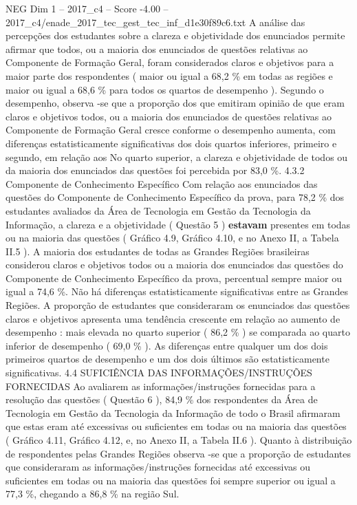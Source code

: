 \begin{textsample}{NEG Dim 1 – 2017\_c4 – Score -4.00 – 2017\_c4/enade\_2017\_tec\_gest\_tec\_inf\_d1e30f89c6.txt}
A análise das percepções dos estudantes sobre a clareza e objetividade dos enunciados permite afirmar que todos, ou a maioria dos enunciados de questões relativas ao Componente de Formação Geral, foram considerados claros e objetivos para a maior parte dos respondentes ( maior ou igual a 68,2 \% em todas as regiões e maior ou igual a 68,6 \% para todos os quartos de desempenho ).
Segundo o desempenho, observa -se que a proporção dos que emitiram opinião de que eram claros e objetivos todos, ou a maioria dos enunciados de questões relativas ao Componente de Formação Geral cresce conforme o desempenho aumenta, com diferenças estatisticamente significativas dos dois quartos inferiores, primeiro e segundo, em relação aos No quarto superior, a clareza e objetividade de todos ou da maioria dos enunciados das questões foi percebida por 83,0 \%. 4.3.2 Componente de Conhecimento Específico Com relação aos enunciados das questões do Componente de Conhecimento Específico da prova, para 78,2 \% dos estudantes avaliados da Área de Tecnologia em Gestão da Tecnologia da Informação, a clareza e a objetividade ( Questão 5 ) \textbf{estavam} presentes em todas ou na maioria das questões ( Gráfico 4.9, Gráfico 4.10, e no Anexo II, a Tabela II.5 ).
A maioria dos estudantes de todas as Grandes Regiões brasileiras considerou claros e objetivos todos ou a maioria dos enunciados das questões do Componente de Conhecimento Específico da prova, percentual sempre maior ou igual a 74,6 \%.
Não há diferenças estatisticamente significativas entre as Grandes Regiões.
A proporção de estudantes que consideraram os enunciados das questões claros e objetivos apresenta uma tendência crescente em relação ao aumento de desempenho : mais elevada no quarto superior ( 86,2 \% ) se comparada ao quarto inferior de desempenho ( 69,0 \% ).
As diferenças entre qualquer um dos dois primeiros quartos de desempenho e um dos dois últimos são estatisticamente significativas. 4.4 SUFICIÊNCIA DAS INFORMAÇÕES/INSTRUÇÕES FORNECIDAS Ao avaliarem as informações/instruções fornecidas para a resolução das questões ( Questão 6 ), 84,9 \% dos respondentes da Área de Tecnologia em Gestão da Tecnologia da Informação de todo o Brasil afirmaram que estas eram até excessivas ou suficientes em todas ou na maioria das questões ( Gráfico 4.11, Gráfico 4.12, e, no Anexo II, a Tabela II.6 ).
Quanto à distribuição de respondentes pelas Grandes Regiões observa -se que a proporção de estudantes que consideraram as informações/instruções fornecidas até excessivas ou suficientes em todas ou na maioria das questões foi sempre superior ou igual a 77,3 \%, chegando a 86,8 \% na região Sul.

\end{textsample}

